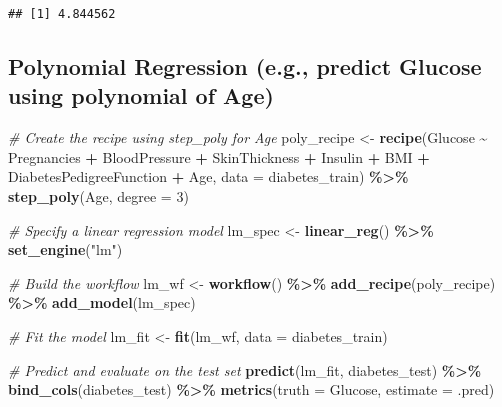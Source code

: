 \documentclass[
]{article}
\newenvironment{Shaded}{\begin{snugshade}}{\end{snugshade}}
\newcommand{\AttributeTok}[1]{\textcolor[rgb]{0.13,0.29,0.53}{#1}}
\newcommand{\CommentTok}[1]{\textcolor[rgb]{0.56,0.35,0.01}{\textit{#1}}}
\newcommand{\DecValTok}[1]{\textcolor[rgb]{0.00,0.00,0.81}{#1}}
\newcommand{\FunctionTok}[1]{\textcolor[rgb]{0.13,0.29,0.53}{\textbf{#1}}}
\newcommand{\NormalTok}[1]{#1}
\newcommand{\OtherTok}[1]{\textcolor[rgb]{0.56,0.35,0.01}{#1}}
\newcommand{\SpecialCharTok}[1]{\textcolor[rgb]{0.81,0.36,0.00}{\textbf{#1}}}
\newcommand{\StringTok}[1]{\textcolor[rgb]{0.31,0.60,0.02}{#1}}
\begin{document}
\begin{Shaded}
\end{Shaded}

\begin{verbatim}
## [1] 4.844562
\end{verbatim}

\subsection{Polynomial Regression (e.g., predict Glucose using
polynomial of
Age)}\label{polynomial-regression-e.g.-predict-glucose-using-polynomial-of-age}

\begin{Shaded}
\begin{Highlighting}[]
\CommentTok{\# Create the recipe using step\_poly for Age}
\NormalTok{poly\_recipe }\OtherTok{\textless{}{-}} \FunctionTok{recipe}\NormalTok{(Glucose }\SpecialCharTok{\textasciitilde{}}\NormalTok{ Pregnancies }\SpecialCharTok{+}\NormalTok{ BloodPressure }\SpecialCharTok{+}\NormalTok{ SkinThickness }\SpecialCharTok{+} 
\NormalTok{                         Insulin }\SpecialCharTok{+}\NormalTok{ BMI }\SpecialCharTok{+}\NormalTok{ DiabetesPedigreeFunction }\SpecialCharTok{+}\NormalTok{ Age, }\AttributeTok{data =}\NormalTok{ diabetes\_train) }\SpecialCharTok{\%\textgreater{}\%}
  \FunctionTok{step\_poly}\NormalTok{(Age, }\AttributeTok{degree =} \DecValTok{3}\NormalTok{)}

\CommentTok{\# Specify a linear regression model}
\NormalTok{lm\_spec }\OtherTok{\textless{}{-}} \FunctionTok{linear\_reg}\NormalTok{() }\SpecialCharTok{\%\textgreater{}\%}
  \FunctionTok{set\_engine}\NormalTok{(}\StringTok{"lm"}\NormalTok{)}

\CommentTok{\# Build the workflow}
\NormalTok{lm\_wf }\OtherTok{\textless{}{-}} \FunctionTok{workflow}\NormalTok{() }\SpecialCharTok{\%\textgreater{}\%}
  \FunctionTok{add\_recipe}\NormalTok{(poly\_recipe) }\SpecialCharTok{\%\textgreater{}\%}
  \FunctionTok{add\_model}\NormalTok{(lm\_spec)}

\CommentTok{\# Fit the model}
\NormalTok{lm\_fit }\OtherTok{\textless{}{-}} \FunctionTok{fit}\NormalTok{(lm\_wf, }\AttributeTok{data =}\NormalTok{ diabetes\_train)}

\CommentTok{\# Predict and evaluate on the test set}
\FunctionTok{predict}\NormalTok{(lm\_fit, diabetes\_test) }\SpecialCharTok{\%\textgreater{}\%}
  \FunctionTok{bind\_cols}\NormalTok{(diabetes\_test) }\SpecialCharTok{\%\textgreater{}\%}
  \FunctionTok{metrics}\NormalTok{(}\AttributeTok{truth =}\NormalTok{ Glucose, }\AttributeTok{estimate =}\NormalTok{ .pred)}
\end{Highlighting}
\end{Shaded}
\end{document}
